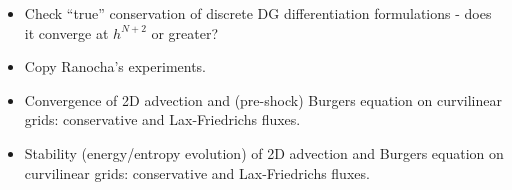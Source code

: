 \documentclass[preprint,10pt]{article}
\theoremstyle{definition}
\theoremstyle{lemma}
\newcommand{\pd}[2]{\frac{\partial#1}{\partial#2}}
\newcommand{\nor}[1]{\left\| #1 \right\|}
\newcommand{\LRp}[1]{\left( #1 \right)}
\newcommand{\LRa}[1]{\left\langle #1 \right\rangle}
\newcommand{\LRc}[1]{\left\{ #1 \right\}}
\newcommand{\jump}[1] {\ensuremath{\llbracket#1\rrbracket}}
\newcommand{\avg}[1] {\ensuremath{\LRc{\!\{#1\}\!}}}
\newcommand*\diff[1]{\mathop{}\!{\mathrm{d}#1}}
\begin{document}
\begin{itemize}
\item Check ``true'' conservation of discrete DG differentiation formulations - does it converge at $h^{N+2}$ or greater?
\item Copy Ranocha's experiments.  
\item Convergence of 2D advection and (pre-shock) Burgers equation on curvilinear grids: conservative and Lax-Friedrichs fluxes.  
\item Stability (energy/entropy evolution) of 2D advection and Burgers equation on curvilinear grids: conservative and Lax-Friedrichs fluxes.  
\end{itemize}

%
%
%
\end{document}
